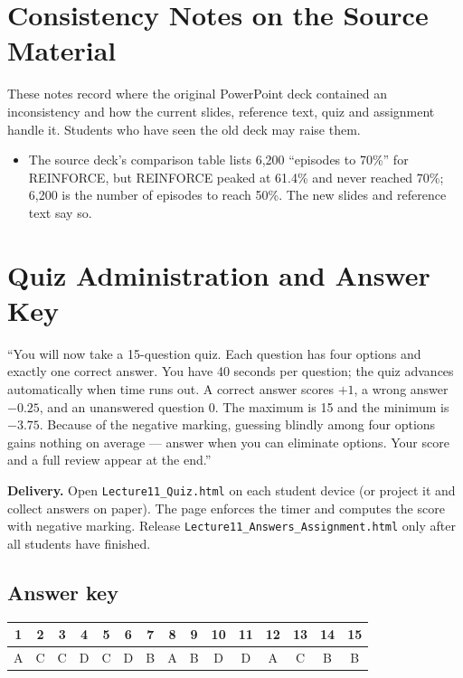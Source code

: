\documentclass[11pt]{article}
\begin{document}
\section{Consistency Notes on the Source Material}These notes record where the original PowerPoint deck contained an inconsistency and how the current slides, reference text, quiz and assignment handle it. Students who have seen the old deck may raise them.\begin{itemize}\item The source deck's comparison table lists 6,200 ``episodes to 70\%'' for REINFORCE, but REINFORCE peaked at 61.4\% and never reached 70\%; 6,200 is the number of episodes to reach 50\%. The new slides and reference text say so.\end{itemize}

\section{Quiz Administration and Answer Key}

\begin{sayit}``You will now take a 15-question quiz. Each question has four options and exactly one correct answer. You have 40 seconds per question; the quiz advances automatically when time runs out. A correct answer scores $+1$, a wrong answer $-0.25$, and an unanswered question 0. The maximum is 15 and the minimum is $-3.75$. Because of the negative marking, guessing blindly among four options gains nothing on average --- answer when you can eliminate options. Your score and a full review appear at the end.''\end{sayit}

\textbf{Delivery.} Open \texttt{Lecture11\_Quiz.html} on each student device (or project it and collect answers on paper). The page enforces the timer and computes the score with negative marking. Release \texttt{Lecture11\_Answers\_Assignment.html} only after all students have finished.

\subsection*{Answer key}\begin{center}\small\renewcommand{\arraystretch}{1.3}\begin{tabular}{|c|c|c|c|c|c|c|c|c|c|c|c|c|c|c|}\hline \textbf{1} & \textbf{2} & \textbf{3} & \textbf{4} & \textbf{5} & \textbf{6} & \textbf{7} & \textbf{8} & \textbf{9} & \textbf{10} & \textbf{11} & \textbf{12} & \textbf{13} & \textbf{14} & \textbf{15}\\\hline A & C & C & D & C & D & B & A & B & D & D & A & C & B & B\\\hline\end{tabular}\end{center}
\end{document}
